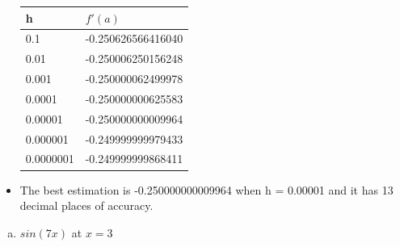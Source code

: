 \documentclass[12pt,en,a4paper]{article}
\begin{document}
\begin{itemize}
		\begin{table}[h]
			\centering
			\begin{tabular}{|l|l|}
				\hline
				h & \(f'(a)\) \\ \hline
				0.1 & -0.250626566416040 \\ \hline
				0.01 & -0.250006250156248 \\ \hline
				0.001 & -0.250000062499978 \\ \hline
				0.0001 & -0.250000000625583 \\ \hline
				0.00001 & -0.250000000009964 \\ \hline
				0.000001 & -0.249999999979433 \\ \hline
				0.0000001 & -0.249999999868411 \\ \hline
			\end{tabular}
		\end{table}
		\item The best estimation is -0.250000000009964 when h = 0.00001 and it has 13 decimal places of accuracy.
	\end{itemize}
	\begin{enumerate}[b)]
		\item \(sin(7x)\) at \(x=3\)
	\end{enumerate}
\end{document}
